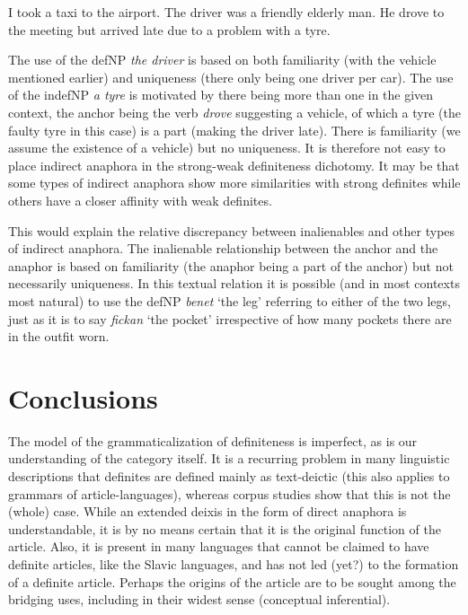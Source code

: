 \documentclass[output=paper]{langsci/langscibook}
\begin{document}
\begin{exe}
\ex\label{6ex:35}
I took a taxi to the airport. The driver was a friendly elderly man.
\ex\label{6ex:36}
He drove to the meeting but arrived late due to a problem with a tyre.
\end{exe}

The use of the defNP {\emph{the driver}} is based on both familiarity (with the vehicle mentioned earlier) and uniqueness (there only being one driver per car). The use of the indefNP {\emph{a tyre}} is motivated by there being more than one in the given context, the anchor being the verb {\emph{drove}} suggesting a vehicle, of which a tyre (the faulty tyre in this case) is a part (making the driver late). There is familiarity (we assume the existence of a vehicle) but no uniqueness. 
It is therefore not easy to place indirect anaphora in the strong-weak definiteness dichotomy. It may be that some types of indirect anaphora show more similarities with strong definites while others have a closer affinity with weak definites.

This would explain the relative discrepancy between inalienables and other types of indirect anaphora. The inalienable relationship between the anchor and the anaphor is based on familiarity (the anaphor being a part of the anchor) but not necessarily uniqueness. In this textual relation it is possible (and in most contexts most natural) to use the defNP {\emph{benet}} `the leg' referring to either of the two legs, just as it is to say {\emph{fickan}} `the pocket' irrespective of how many pockets there are in the outfit worn. 


\section{Conclusions}\label{6sec:6}

The model of the grammaticalization of definiteness is imperfect, as is our understanding of the category itself. It is a recurring problem in many linguistic descriptions that definites are defined mainly as text-deictic (this also applies to grammars of article-languages), whereas corpus studies show that this is not the (whole) case. While an extended deixis in the form of direct anaphora is understandable, it is by no means certain that it is the original function of the article. Also, it is present in many languages that cannot be claimed to have definite articles, like the Slavic languages, and has not led (yet?) to the formation of a definite article. Perhaps the origins of the article are to be sought among the bridging uses, including in their widest sense (conceptual inferential). 
\end{document}
